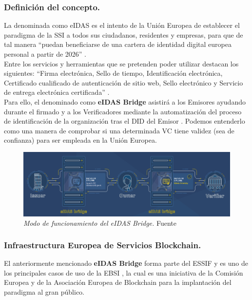 \documentclass[../main.tex]{subfiles}
\begin{document}
\subsubsection{Definición del concepto.}
La denominada como \acrfull{eIDAS} es el intento de la Unión Europea de establecer el paradigma de la \acrfull{SSI} a todos sus ciudadanos, residentes y empresas, para que de tal manera ``puedan beneficiarse de una cartera de identidad digital europea personal a partir de 2026''  \cite{DigitalIdentityRegulation}.
\\

Entre los servicios y herramientas que se pretenden poder utilizar destacan los siguientes: ``Firma electrónica, Sello de tiempo, Identificación electrónica, Certificado cualificado de autenticación de sitio web, Sello electrónico y Servicio de entrega electrónica certificada'' \cite{EuropeanDigitalIdentity}.
\\

Para ello, el denominado como \textbf{eIDAS Bridge} asistirá a los Emisores ayudando durante el firmado y a los Verificadores mediante la automatización del proceso de identificación de la organización tras el \acrshort{DID} del Emisor \cite{SSIeIDAS}. Podemos entenderlo como una manera de comprobar si una determinada \acrshort{VC} tiene validez (sea de confianza) para ser empleada en la Unión Europea. 
\\

\begin{figure}[htbp]
    \centering
    \includegraphics[width=1\linewidth]{images/eIDAS.png}
    \caption{\textit{Modo de funcionamiento del eIDAS Bridge.} Fuente \cite{SSIeIDAS}}
    \label{fig:eIDAS}
\end{figure}


\newpage
\subsubsection{Infraestructura Europea de Servicios Blockchain.}
El anteriormente mencionado \textbf{eIDAS Bridge} forma parte del \acrfull{ESSIF} y es uno de los principales casos de uso de la \acrfull{EBSI} \cite{SSIeIDAS}, la cual es una iniciativa de la Comisión Europea y de la Asociación Europea de Blockchain para la implantación del paradigma al gran público.
\\
\end{document}
